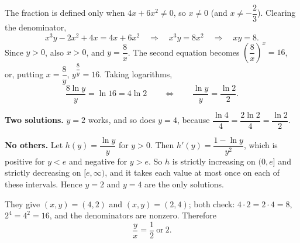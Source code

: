 The fraction is defined only when $4x+6x^2\ne0$, so $x\ne0$ (and $x\ne-\dfrac{2}{3}$). Clearing the denominator,
\[
x^3y-2x^2+4x=4x+6x^2\quad\Longrightarrow\quad x^3y=8x^2\quad\Longrightarrow\quad xy=8 .
\]
Since $y>0$, also $x>0$, and $y=\dfrac{8}{x}$. The second equation becomes $\left(\dfrac{8}{x}\right)^x=16$, or, putting $x=\dfrac{8}{y}$, $y^{\dfrac{8}{y}}=16$. Taking logarithms,
\[
\dfrac{8\ln y}{y}=\ln16=4\ln2\qquad\Longleftrightarrow\qquad \dfrac{\ln y}{y}=\dfrac{\ln 2}{2}.
\]

\textbf{Two solutions.} $y=2$ works, and so does $y=4$, because $\dfrac{\ln4}{4}=\dfrac{2\ln2}{4}=\dfrac{\ln2}{2}$.

\textbf{No others.} Let $h(y)=\dfrac{\ln y}{y}$ for $y>0$. Then $h'(y)=\dfrac{1-\ln y}{y^2}$, which is positive for $y<e$ and negative for $y>e$. So $h$ is strictly increasing on $(0,e]$ and strictly decreasing on $[e,\infty)$, and it takes each value at most once on each of these intervals. Hence $y=2$ and $y=4$ are the only solutions.

They give $(x,y)=(4,2)$ and $(x,y)=(2,4)$; both check: $4\cdot2=2\cdot4=8$, $2^4=4^2=16$, and the denominators are nonzero. Therefore
\[
\dfrac{y}{x}=\boxed{\dfrac{1}{2}\ \text{or}\ 2}.
\]
